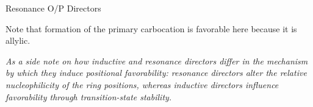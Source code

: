 \begin{core}{Resonance O/P Directors}

        Note that formation of the primary carbocation is favorable here because it is allylic.

        \textit{As a side note on how inductive and resonance directors differ in the mechanism by which they induce positional favorability: resonance directors alter the relative nucleophilicity of the ring positions, whereas inductive directors influence favorability through transition-state stability.}

      \end{core}


